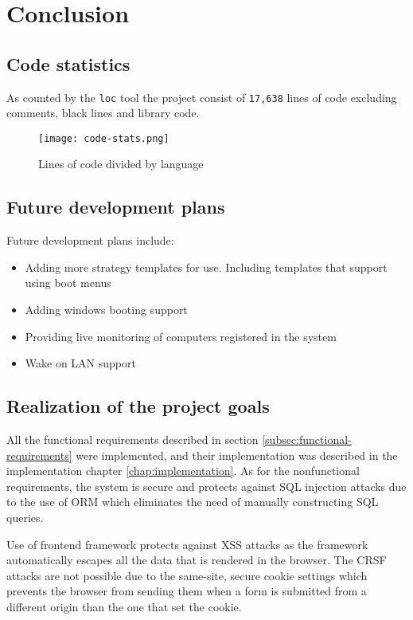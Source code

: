 \documentclass[./main.tex]{subfiles}
\begin{document}
\chapter{Conclusion}

\section{Code statistics}

As counted by the \texttt{loc} \cite{loc} tool the project consist of \texttt{17,638} lines of code excluding
comments, black lines and library code.

\begin{figure}[H]
  \centering
  \texttt{[image: code-stats.png]}
  \caption{Lines of code divided by language}
\end{figure}

\section{Future development plans}

Future development plans include:

\begin{itemize}
  \item Adding more strategy templates for use. Including templates that support
        using boot menus
  \item Adding windows booting support
  \item Providing live monitoring of computers registered in the system
  \item Wake on LAN support
\end{itemize}


\section{Realization of the project goals}

All the functional requirements described in section \ref{subsec:functional-requirements} were implemented, and their
implementation was described in the implementation chapter \ref{chap:implementation}. As for the nonfunctional requirements, the system is secure and protects against SQL injection
attacks due to the use of ORM which eliminates the need of manually constructing
SQL queries.


Use of frontend framework protects against XSS attacks as the framework automatically escapes all the data that is rendered in the browser. The CRSF attacks are
not possible due to the same-site, secure cookie settings which prevents the browser
from sending them when a form is submitted from a different origin than the one
that set the cookie.
\end{document}

